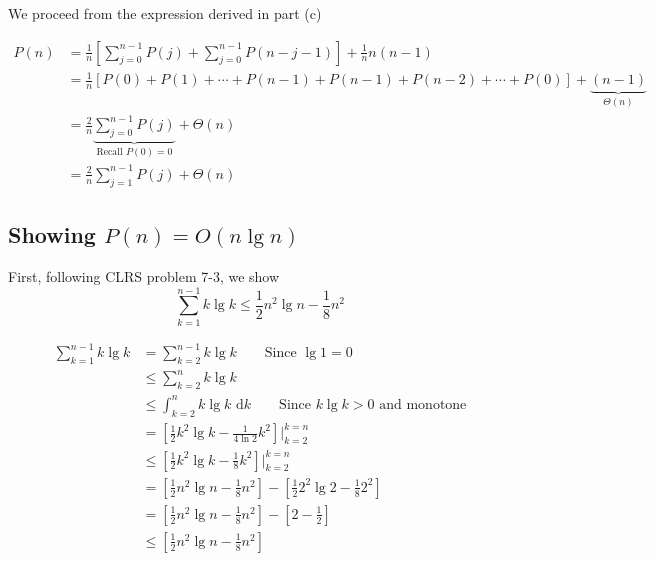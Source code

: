 \documentclass[paper=a4, fontsize=11pt]{scrartcl} %
\numberwithin{equation}{section} %
\numberwithin{figure}{section} %
\numberwithin{table}{section} %
\begin{document}
We proceed from the expression derived in part (c)

\begin{align*}
P(n) &= \frac{1}{n}\left[\sum_{j = 0}^{n-1} P(j) + \sum_{j = 0}^{n-1} P(n - j -1)\right] + \frac{1}{n}n(n - 1) \\
	&= \frac{1}{n}\left[P(0) + P(1) + \cdots + P(n - 1) + P(n - 1) + P(n - 2) + \cdots + P(0)\right] + \underbrace{(n - 1)}_{\Theta(n)} \\
	&= \frac{2}{n}\underbrace{\sum_{j = 0}^{n-1} P(j)}_{\textrm{Recall } P(0) = 0} + \Theta(n) \\
	&= \frac{2}{n}\sum_{j = 1}^{n-1} P(j) + \Theta(n)
\end{align*}

\subsection{Showing $P(n) = O(n \lg n)$}

First, following CLRS problem 7-3, we show
\[\sum_{k = 1}^{n - 1} k \lg k \leq \frac{1}{2}n^2 \lg n - \frac{1}{8} n^2\]

\begin{align*}
\sum_{k = 1}^{n - 1} k \lg k  &= \sum_{k = 2}^{n - 1} k \lg k \qquad{} \textrm{Since } \lg 1 = 0 \\
	&\leq \sum_{k = 2}^{n} k \lg k \\
	&\leq \int_{k = 2}^{n} k \lg k \textrm{ d}k \qquad{} \textrm{Since } k \lg k > 0 \textrm{ and monotone} \\
	&= \left[\frac{1}{2}k^2 \lg k - \frac{1}{4\ln2}k^2\right]\Bigg|_{k=2}^{k = n}\\
	&\leq \left[\frac{1}{2}k^2 \lg k - \frac{1}{8}k^2\right]\Bigg|_{k=2}^{k = n}\\
	&= \left[\frac{1}{2}n^2 \lg n - \frac{1}{8}n^2\right] - \left[\frac{1}{2}2^2 \lg 2 - \frac{1}{8}2^2\right] \\
	&= \left[\frac{1}{2}n^2 \lg n - \frac{1}{8}n^2\right] - \left[2 - \frac{1}{2}\right] \\
	&\leq \left[\frac{1}{2}n^2 \lg n - \frac{1}{8}n^2\right]
\end{align*}
\end{document}
